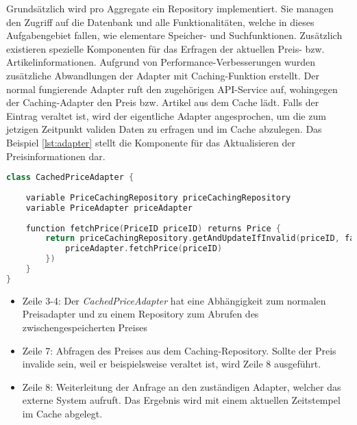 Grundsätzlich wird pro Aggregate ein Repository implementiert. Sie managen den Zugriff auf die Datenbank und alle Funktionalitäten, welche in dieses Aufgabengebiet fallen, wie elementare Speicher- und Suchfunktionen. Zusätzlich existieren spezielle Komponenten für das Erfragen der aktuellen Preis- bzw. Artikelinformationen. Aufgrund von Performance-Verbesserungen wurden zusätzliche Abwandlungen der Adapter mit Caching-Funktion erstellt. Der normal fungierende Adapter ruft den zugehörigen API-Service auf, wohingegen der Caching-Adapter den Preis bzw. Artikel aus dem Cache lädt. Falls der Eintrag veraltet ist, wird der eigentliche Adapter angesprochen, um die zum jetzigen Zeitpunkt validen Daten zu erfragen und im Cache abzulegen. Das Beispiel \ref{lst:adapter} stellt die Komponente für das Aktualisieren der Preisinformationen dar. 

\vspace{0,5cm}
\begin{minipage}{\linewidth} %
	\begin{lstlisting}[caption={Preisadapter mit Caching-Funktion}, label={lst:adapter}, language=Kotlin]
class CachedPriceAdapter {
	
	variable PriceCachingRepository priceCachingRepository 
	variable PriceAdapter priceAdapter
	
	function fetchPrice(PriceID priceID) returns Price {
		return priceCachingRepository.getAndUpdateIfInvalid(priceID, fallback = {
			priceAdapter.fetchPrice(priceID)
		})
	}
}
	\end{lstlisting}
	\begin{itemize}[noitemsep,nolistsep]
		\item Zeile 3-4: Der \emph{CachedPriceAdapter} hat eine Abhängigkeit zum normalen Preisadapter und zu einem Repository zum Abrufen des zwischengespeicherten Preises
		\item Zeile 7: Abfragen des Preises aus dem Caching-Repository. Sollte der Preis invalide sein, weil er beispielsweise veraltet ist, wird Zeile 8 ausgeführt.
		\item Zeile 8: Weiterleitung der Anfrage an den zuständigen Adapter, welcher das externe System aufruft. Das Ergebnis wird mit einem aktuellen Zeitstempel im Cache abgelegt.
	\end{itemize}
\end{minipage}
